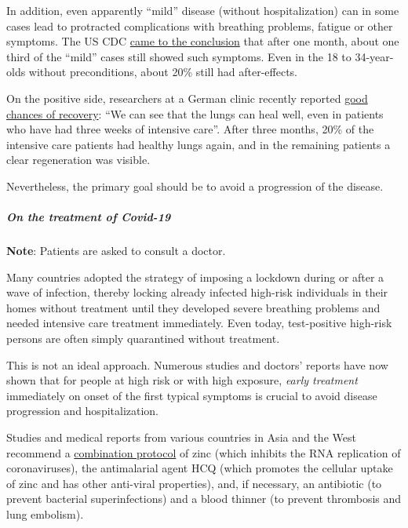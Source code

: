 In addition, even apparently ``mild'' disease (without hospitalization)
can in some cases lead to protracted complications with breathing
problems, fatigue or other symptoms. The US CDC
\href{https://www.cdc.gov/mmwr/volumes/69/wr/mm6930e1.htm}{came to the
conclusion} that after one month, about one third of the ``mild'' cases
still showed such symptoms. Even in the 18 to 34-year-olds without
preconditions, about 20\% still had after-effects.

On the positive side, researchers at a German clinic recently reported
\href{https://www.tagesschau.de/investigativ/kontraste/coronavirus-langzeitfolgen-101.html}{good
chances of recovery}: ``We can see that the lungs can heal well, even in
patients who have had three weeks of intensive care''. After three
months, 20\% of the intensive care patients had healthy lungs again, and
in the remaining patients a clear regeneration was visible.

Nevertheless, the primary goal should be to avoid a progression of the
disease.

\hypertarget{on-the-treatment-of-covid-19}{%
\subparagraph{\texorpdfstring{\textbf{On the treatment of
Covid-19}}{On the treatment of Covid-19}}\label{on-the-treatment-of-covid-19}}

\textbf{Note}: Patients are asked to consult a doctor.

Many countries adopted the strategy of imposing a lockdown during or
after a wave of infection, thereby locking already infected high-risk
individuals in their homes without treatment until they developed severe
breathing problems and needed intensive care treatment immediately. Even
today, test-positive high-risk persons are often simply quarantined
without treatment.

This is not an ideal approach. Numerous studies and doctors' reports
have now shown that for people at high risk or with high exposure,
\emph{early treatment} immediately on onset of the first typical
symptoms is crucial to avoid disease progression and hospitalization.

Studies and medical reports from various countries in Asia and the West
recommend a
\href{https://swprs.org/on-the-treatment-of-covid-19/}{combination
protocol} of zinc (which inhibits the RNA replication of coronaviruses),
the antimalarial agent HCQ (which promotes the cellular uptake of zinc
and has other anti-viral properties), and, if necessary, an antibiotic
(to prevent bacterial superinfections) and a blood thinner (to prevent
thrombosis and lung embolism).

